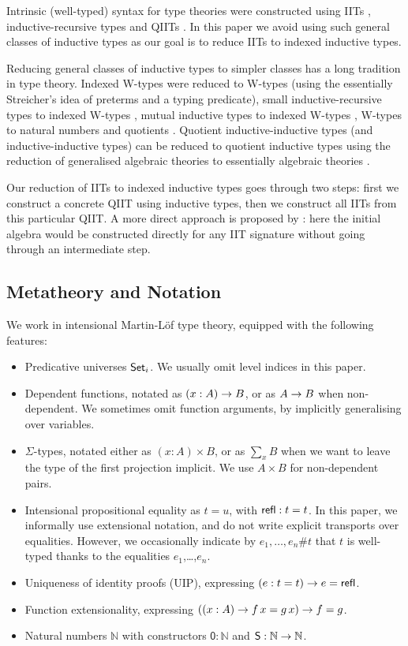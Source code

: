 \documentclass[a4paper,UKenglish,cleveref, autoref]{lipics-v2019}
\begin{document}
Intrinsic (well-typed) syntax for type theories were constructed using
IITs \cite{chapman09eatitself}, inductive-recursive types
\cite{nisse,Altenkirch:2014:CO:2631172.2631176} and QIITs
\cite{ttintt}. In this paper we avoid using such general classes of
inductive types as our goal is to reduce IITs to indexed inductive
types.

Reducing general classes of inductive types to simpler classes has a
long tradition in type theory. Indexed W-types were reduced to W-types
\cite{indexedcont} (using the essentially Streicher's idea of preterms
and a typing predicate), small inductive-recursive types to indexed
W-types \cite{malatasta13smallir}, mutual inductive types to indexed
W-types \cite{mutual}, W-types to natural numbers and quotients
\cite{Ahrens2019}. Quotient inductive-inductive types (and
inductive-inductive types) can be reduced to quotient inductive types
using the reduction of generalised algebraic theories to essentially
algebraic theories \cite{gat}.

Our reduction of IITs to indexed inductive types goes through two
steps: first we construct a concrete QIIT using inductive types, then
we construct all IITs from this particular QIIT. A more direct
approach is proposed by \cite{erasure}: here the initial algebra would
be constructed directly for any IIT signature without going through an
intermediate step.

\subsection{Metatheory and Notation}

We work in intensional Martin-Löf type theory, equipped with the following features:
\begin{itemize}
  \item Predicative universes $\mathsf{Set}_i$. We usually omit level indices in this paper.
  \item Dependent functions, notated as $(x : A)\rightarrow B$, or as $A \rightarrow B$ when
    non-dependent. We sometimes omit function arguments, by implicitly
    generalising over variables.
  \item $\Sigma$-types, notated either as $(x : A)\times B$, or as $\sum\limits_{x} B$
        when we want to leave the type of the first projection implicit. We use $A
        \times B$ for non-dependent pairs.
  \item Intensional propositional equality as $t = u$, with $\mathsf{refl} : t = t$. In
    this paper, we informally use extensional notation, and do not write
    explicit transports over equalities. However, we occasionally indicate by
    $e_1,\dots,e_n \#t$ that $t$ is well-typed thanks to the equalities
    $e_1$,\dots,$e_n$.
  \item Uniqueness of identity proofs (UIP), expressing $(e : t = t)\rightarrow e = \mathsf{refl}$.
  \item Function extensionality, expressing $((x : A) \rightarrow f\,x = g\,x) \rightarrow f = g$.
  \item Natural numbers $\mathbb{N}$ with constructors $\mathsf{0}:\mathbb{N}$ and $\mathsf{S}:\mathbb{N}\rightarrow\mathbb{N}$.

\end{itemize}
\end{document}
